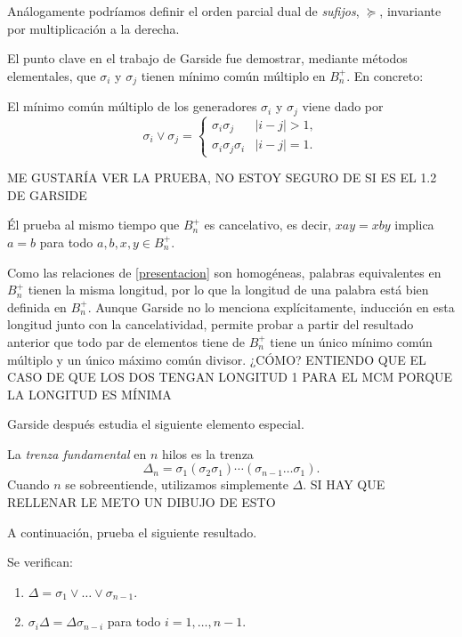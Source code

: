\documentclass[TFG.tex]{subfiles}
\begin{document}
\begin{nota}
Análogamente podríamos definir el orden parcial dual  de \emph{sufijos}, $\succcurlyeq$, invariante por multiplicación a la derecha.
\end{nota}

El punto clave en el trabajo de Garside fue demostrar, mediante métodos elementales, que $\sigma_i$ y $\sigma_j$ tienen mínimo común múltiplo en $B_n^+$. En concreto:
\begin{prop} 
El mínimo común múltiplo de los generadores $\sigma_i$ y $\sigma_j$ viene dado por
$$\sigma_i\lor\sigma_j=\begin{cases}
\sigma_i\sigma_j & |i-j|>1,\\
\sigma_i\sigma_j\sigma_i & |i-j|=1.
\end{cases}$$
\end{prop}
ME GUSTARÍA VER LA PRUEBA, NO ESTOY SEGURO DE SI ES EL 1.2 DE GARSIDE

Él prueba al mismo tiempo que $B_n^+$ es cancelativo, es decir, $xay=xby$ implica $a=b$ para todo $a,b,x,y\in B_n^+$.

Como las relaciones de \ref{presentacion} son homogéneas, palabras equivalentes en $B_n^+$ tienen la misma longitud, por lo que la longitud de una palabra está bien definida en $B_n^+$. Aunque Garside no lo menciona explícitamente, inducción en esta longitud junto con la cancelatividad, permite probar a partir del resultado anterior que todo par de elementos tiene de $B_n^+$ tiene un único mínimo común múltiplo y un único máximo común divisor. ¿CÓMO? ENTIENDO QUE EL CASO DE QUE LOS DOS TENGAN LONGITUD 1 PARA EL MCM PORQUE LA LONGITUD ES MÍNIMA %

Garside después estudia el siguiente elemento especial.
\begin{defi}
La \emph{trenza fundamental} en $n$ hilos es la trenza
$$\Delta_n=\sigma_1(\sigma_2\sigma_1)\cdots(\sigma_{n-1}\dots\sigma_1).$$
Cuando $n$ se sobreentiende, utilizamos simplemente $\Delta$. SI HAY QUE RELLENAR LE METO UN DIBUJO DE ESTO
\end{defi} 
A continuación, prueba el siguiente resultado.
\begin{prop}\label{conjuga}
Se verifican: 
\begin{enumerate}
\item $\Delta=\sigma_1\lor\dots\lor\sigma_{n-1}$.
\item $\sigma_i\Delta=\Delta\sigma_{n-i}$ para todo $i=1,\dots, n-1$.
\end{enumerate}
\end{prop} 
\end{document}
